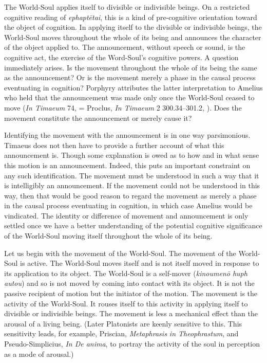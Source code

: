 The World-Soul applies itself to divisible or indivisible beings. On a restricted cognitive reading of \emph{ephaptētai}, this is a kind of pre-cognitive orientation toward the object of cognition. In applying itself to the divisible or indivisible beings, the World-Soul moves throughout the whole of its being and announces the character of the object applied to. The announcement, without speech or sound, is the cognitive act, the exercise of the Word-Soul's cognitive powers. A question immediately arises. Is the movement throughout the whole of its being the same as the announcement? Or is the movement merely a phase in the causal process eventuating in cognition? Porphyry attributes the latter interpretation to Amelius who held that the announcement was made only once the World-Soul ceased to move (\emph{In Timaeum} 74, \citealt{Sodano:1964mf} = Proclus, \emph{In Timaeum} 2 300.34--301.2, \citealt{Diehl:1903re}). Does the movement constitute the announcement or merely cause it?

Identifying the movement with the announcement is in one way parsimonious. Timaeus does not then have to provide a further account of what this announcement is. Though some explanation is owed as to how and in what sense this motion is an announcement. Indeed, this puts an important constraint on any such identification. The movement must be understood in such a way that it is intelligibly an announcement. If the movement could not be understood in this way, then that would be good reason to regard the movement as merely a phase in the causal process eventuating in cognition, in which case Amelius would be vindicated. The identity or difference of movement and announcement is only settled once we have a better understanding of the potential cognitive significance of the World-Soul moving itself throughout the whole of its being.

Let us begin with the movement of the World-Soul. The movement of the World-Soul is active. The World-Soul moves itself and is not itself moved in response to its application to its object. The World-Soul is a self-mover (\emph{kinoumenō huph autou}) and so is not moved by coming into contact with its object. It is not the passive recipient of motion but the initiator of the motion. The movement is the activity of the World-Soul. It rouses itself to this activity in applying itself to divisible or indivisible beings. The movement is less a mechanical effect than the arousal of a living being. (Later Platonists are keenly sensitive to this. This sensitivity leads, for example, Priscian, \emph{Metaphrasis in Theophrastum}, and Pseudo-Simplicius, \emph{In De anima}, to portray the activity of the soul in perception as a mode of arousal.)

